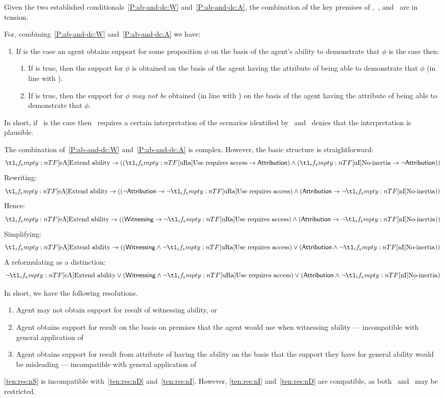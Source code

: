\begin{note}[Summary]
  Given the two established conditionals~\ref{P:ab-and-dc:W} and~\ref{P:ab-and-dc:A}, the combination of the key premises of \uRa{},~\eA{}, and~\nI{} are in tension.

  For, combining~\ref{P:ab-and-dc:W} and~\ref{P:ab-and-dc:A} we have:
  \begin{enumerate}[label=(CC), ref=(CC)]
  \item If \eA{} is the case an agent obtains support for some proposition \(\phi\) on the basis of the agent's ability to demonstrate that \(\phi\) is the case then:
    \begin{enumerate}[label=(C\arabic*\(\sim\)), ]
    \item If \uRa{} is true, then the support for \(\phi\) is obtained on the basis of the agent having the attribute of being able to demonstrate that \(\phi\) (in line with \AR{}).
    \item If \nI{} is true, then the support for \(\phi\) \emph{may not be} obtained (in line with \AR{}) on the basis of the agent having the attribute of being able to demonstrate that \(\phi\).
    \end{enumerate}
  \end{enumerate}
  In short, if~\eA{} is the case then~\uRa{} requires a certain interpretation of the scenarios identified by~\eA{} and~\nI{} denies that the interpretation is plausible.
\end{note}

\begin{note}
  The combination of~\ref{P:ab-and-dc:W} and~\ref{P:ab-and-dc:A} is complex.
  However, the basic structure is straightforward:
  \[\eA{} \rightarrow ((\uRa{} \rightarrow \AR{}) \land (\nI{} \rightarrow \lnot \AR{}))\]
  Rewriting:
  \[\eA{} \rightarrow ((\lnot \AR{} \rightarrow \lnot \uRa{}) \land (\AR{} \rightarrow \lnot \nI{}))\]
  Hence:
    \[\eA{} \rightarrow ((\WR{} \rightarrow \lnot \uRa{}) \land (\AR{} \rightarrow \lnot \nI{}))\]
  Simplifying:
  \[\eA{} \rightarrow ((\WR{} \land \lnot \uRa{}) \lor (\AR{} \land \lnot \nI{}))\]
  A reformulating as a distinction:
  \[\lnot \eA{} \lor (\WR{} \land \lnot \uRa{}) \lor (\AR{} \land\lnot \nI{})\]

  In short, we have the following resolutions.
  \begin{enumerate}
  \item\label{ten:res:nS} Agent may not obtain support for result of witnessing ability, or
  \item\label{ten:res:nD} Agent obtains support for result on the basis on premises that the agent would use when witnessing ability --- incompatible with general application of~\uRa{}
  \item\label{ten:res:nI} Agent obtains support for result from attribute of having the ability on the basis that the support they have for general ability would be misleading --- incompatible with general application of~\nI{}
  \end{enumerate}
  \ref{ten:res:nS} is incompatible with~\ref{ten:res:nD} and~\ref{ten:res:nI}.
  However, \ref{ten:res:nI} and~\ref{ten:res:nD} are compatible, as both~\uRa{} and~\nI{} may be restricted.
\end{note}

